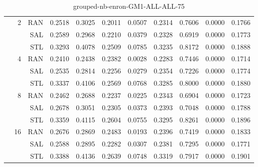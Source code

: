 \begin{center}
\begin{table}[htbp]
\begin{center}
\begin{tabular}{ | r | r | r | r | r | r | r | r | r | r | r |}
 & \multirow{3}{*}{2} & RAN & 0.2518 & 0.3025 & 0.2011 & 0.0507 & 0.2314 & 0.7606 & 0.0000 & 0.1766\\ \cline{3-11}
 &   & SAL & 0.2589 & 0.2968 & 0.2210 & 0.0379 & 0.2328 & 0.6919 & 0.0000 & 0.1773\\ \cline{3-11}
 &   & STL & 0.3293 & 0.4078 & 0.2509 & 0.0785 & 0.3235 & 0.8172 & 0.0000 & 0.1888\\ \cline{2-11}
 & \multirow{3}{*}{4} & RAN & 0.2410 & 0.2438 & 0.2382 & 0.0028 & 0.2283 & 0.7446 & 0.0000 & 0.1714\\ \cline{3-11}
 &   & SAL & 0.2535 & 0.2814 & 0.2256 & 0.0279 & 0.2354 & 0.7226 & 0.0000 & 0.1774\\ \cline{3-11}
 &   & STL & 0.3337 & 0.4106 & 0.2569 & 0.0768 & 0.3285 & 0.8000 & 0.0000 & 0.1880\\ \cline{2-11}
 & \multirow{3}{*}{8} & RAN & 0.2462 & 0.2688 & 0.2237 & 0.0225 & 0.2343 & 0.6904 & 0.0000 & 0.1723\\ \cline{3-11}
 &   & SAL & 0.2678 & 0.3051 & 0.2305 & 0.0373 & 0.2393 & 0.7048 & 0.0000 & 0.1788\\ \cline{3-11}
 &   & STL & 0.3359 & 0.4115 & 0.2604 & 0.0755 & 0.3295 & 0.8261 & 0.0000 & 0.1896\\ \cline{2-11}
 & \multirow{3}{*}{16} & RAN & 0.2676 & 0.2869 & 0.2483 & 0.0193 & 0.2396 & 0.7419 & 0.0000 & 0.1833\\ \cline{3-11}
 &   & SAL & 0.2588 & 0.2895 & 0.2282 & 0.0307 & 0.2381 & 0.7295 & 0.0000 & 0.1771\\ \cline{3-11}
 &   & STL & 0.3388 & 0.4136 & 0.2639 & 0.0748 & 0.3319 & 0.7917 & 0.0000 & 0.1901\\ \cline{2-11}
\hline
\end{tabular}
\caption{grouped-nb-enron-GM1-ALL-ALL-75}
\end{center}
 \end{table}
\end{center}

